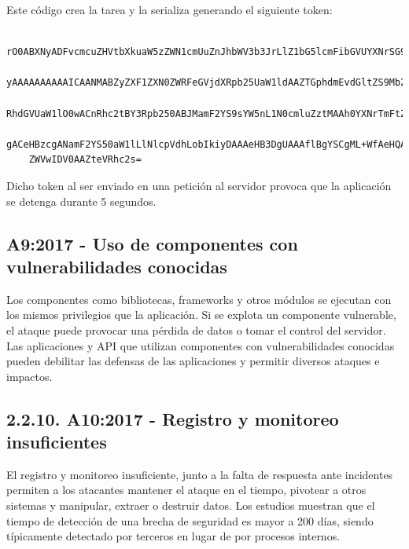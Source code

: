Este código crea la tarea y la serializa generando el siguiente token:

\begin{verbatim}
    rO0ABXNyADFvcmcuZHVtbXkuaW5zZWN1cmUuZnJhbWV3b3JrLlZ1bG5lcmFibGVUYXNrSG9sZGV
    yAAAAAAAAAAICAANMABZyZXF1ZXN0ZWRFeGVjdXRpb25UaW1ldAAZTGphdmEvdGltZS9Mb2NhbE
    RhdGVUaW1lO0wACnRhc2tBY3Rpb250ABJMamF2YS9sYW5nL1N0cmluZztMAAh0YXNrTmFtZXEAf
    gACeHBzcgANamF2YS50aW1lLlNlcpVdhLobIkiyDAAAeHB3DgUAAAflBgYSCgML+WfAeHQAB3Ns
    ZWVwIDV0AAZteVRhc2s=
\end{verbatim}

Dicho token al ser enviado en una petición al servidor provoca que la aplicación se detenga durante 5 segundos.

\newpage
\subsection{A9:2017 - Uso de componentes con vulnerabilidades conocidas}

Los componentes como bibliotecas, frameworks y otros módulos se ejecutan con los mismos
privilegios que la aplicación. Si se explota un componente vulnerable, el ataque puede provocar
una pérdida de datos o tomar el control del servidor. Las aplicaciones y API que utilizan
componentes con vulnerabilidades conocidas pueden debilitar las defensas de las aplicaciones y
permitir diversos ataques e impactos.

\subsection{2.2.10. A10:2017 - Registro y monitoreo insuficientes}

El registro y monitoreo insuficiente, junto a la falta de respuesta ante incidentes permiten a los
atacantes mantener el ataque en el tiempo, pivotear a otros sistemas y manipular, extraer o
destruir datos. Los estudios muestran que el tiempo de detección de una brecha de seguridad es
mayor a 200 días, siendo típicamente detectado por terceros en lugar de por procesos internos. 


\newpage
